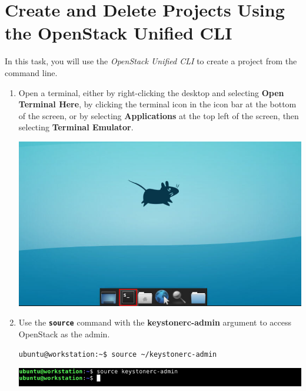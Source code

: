 \documentclass[letterpaper, 12pt]{article}
\begin{document}
\section{Create and Delete Projects Using the OpenStack Unified CLI}
\label{sec:create_and_delete_projects_using_the_openstack_unified_cli}
In this task, you will use the \textit{OpenStack Unified CLI} to create a project from the command line.

\begin{enumerate}    
    \item Open a terminal, either by right-clicking the desktop and selecting \textbf{Open Terminal Here}, by clicking
    the terminal icon in the icon bar at the bottom of the screen, or by selecting \textbf{Applications} at the top
    left of the screen, then selecting \textbf{Terminal Emulator}.

    \begin{center}
        \includegraphics[width=\linewidth]{images/part2/step1.png}
    \end{center}

    \item Use the \textbf{\texttt{source}} command with the \textbf{keystonerc-admin} argument to access OpenStack
    as the admin.
\begin{lstlisting}
ubuntu@workstation:~$ source ~/keystonerc-admin
\end{lstlisting}
    
    \begin{center}
        \includegraphics[width=\linewidth]{images/part2/step2.png}
    \end{center}


\end{enumerate}
\end{document}
